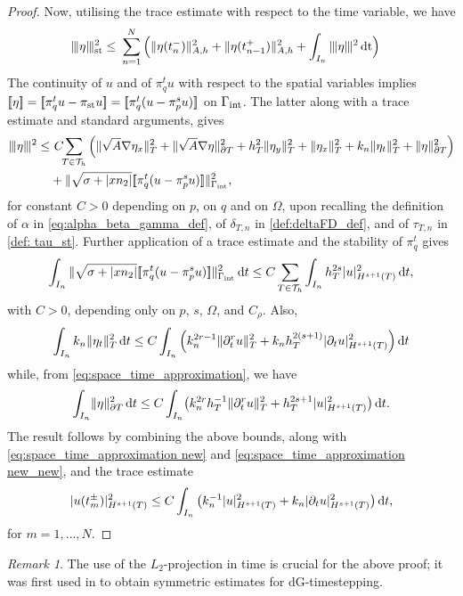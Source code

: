 \documentclass{amsart}
\newcommand{\norm}[2]{\|{#1}\|_{{#2}}}
\newcommand{\ud}{\,{\rm d}}
\newcommand{\jump}[1]{[\kern-0.6mm [{#1}]\kern-0.6mm]}
\newcommand{\su}{\sum_{T \in \Th}}
\newcommand{\Th}{\mathcal{T}_h}
\newcommand{\gint}{\Gamma_{\rm int}}
\newcommand{\ndg}[1]{|\kern-.03cm \|{#1}|\kern-.03cm \|}
\newcommand{\dt}{\,{\rm dt}}
\theoremstyle{definition}
\theoremstyle{remark}
\newtheorem{remark}[theorem]{Remark}
\numberwithin{equation}{section}
\begin{document}
\begin{proof}
Now, utilising the trace estimate with respect to the time variable, we have
\[
\begin{aligned}
	   \ndg{\eta}_{\rm st}^2
\le&\  \sum_{n=1}^N\Big(\norm{\eta(t_n^-)}{A,h}^2+\norm{\eta(t_{n-1}^+)}{A,h}^2+ \int_{I_n} \ndg{\eta}^2 \dt\Big)
\end{aligned}
\]
The continuity of $u$ and of $\pi_q^t u$ with respect to the spatial variables implies $ \jump{\eta}= \jump{\pi_q^t  u- \pi_{\rm st}u}=\jump{\pi_q^t  (u- \pi_p^su)}$ on $\gint$. The latter along with a trace estimate and standard arguments, gives
\[
\begin{split}
	\ndg{\eta}^2
	\le&\  C\!\!
	 \sum_{T \in \Th} \Big(
	 \norm{\sqrt{A}\nabla \eta_x}{T}^2
	 +
	 \norm{ \sqrt{A}\nabla \eta }{\partial T}^2
	 +
h_T^2 \norm{\eta_y}{T}^2
	 +
	 \norm{\eta_x}{T}^2 + k_n\norm{ \eta_t }{T}^2
+\norm{\eta}{\partial T}^2  \Big)\\
	 &
	 + \norm{\sqrt{\sigma+|xn_2|} \jump{\pi_q^t(u- \pi_p^su)}}{\gint }^2,
\end{split}
\]
for constant $C>0$ depending on $p$, on $q$ and on $\Omega$, upon
recalling the definition of $\alpha$ in \eqref{eq:alpha_beta_gamma_def}, of $\delta_{T,n}$ in \eqref{def:deltaFD_def}, and of $\tau_{T,n}$ in \eqref{def: tau_st}. Further application of a trace estimate and the stability of $\pi_q^t$ gives
\begin{equation}\label{sigma_term}
 \int_{I_n}\norm{\sqrt{\sigma+|xn_2|} \jump{\pi_q^t(u- \pi_p^su)}}{\gint }^2\ud t\le 
 C \su  \int_{I_n}h_T^{2s} |u|_{H^{s+1}(T)}^2\ud t,
\end{equation}
with $C>0$, depending only on $p$, $s$, $\Omega$, and $C_\rho$. Also,
\[
\int_{I_n} k_n\norm{ \eta_t }{T}^2 	\ud t \le C\int_{I_n}   \Big( k_n^{2r-1}\norm{\partial_t^r u }{T}^2
+k_nh_T^{2(s+1)}|\partial_t u|_{H^{s+1}(T)}^2	\Big)
\ud t
\]
while, from \eqref{eq:space_time_approximation}, we have
\[
\int_{I_n} \!\norm{\eta}{\partial T}^2	\ud t
\le
C
	\int_{I_n}\!
\big( k^{2r}_nh_T^{-1}\norm{ \partial_t^r  u}{T}^2
+ h^{2s+1}_T|u|_{H^{s+1}(T)}^2
\big)\ud t.
\]
The result follows by combining the above bounds, along with \eqref{eq:space_time_approximation new} and \eqref{eq:space_time_approximation new_new},
and the trace estimate
\[
|u(t_m^\pm)|_{H^{s+1}(T)}^2\le C\int_{I_n}\big( k_n^{-1}|u|_{H^{s+1}(T)}^2+ k_n |\partial_tu|_{H^{s+1}(T)}^2\big)\ud t,
\] for $m=1,\dots,N$.
\end{proof}

\begin{remark}
	The use of the $L_2$-projection in time is crucial for the above proof; it  was first used in \cite{chrysafinos_hou} to obtain symmetric  estimates for dG-timestepping.
\end{remark}
\end{document}
